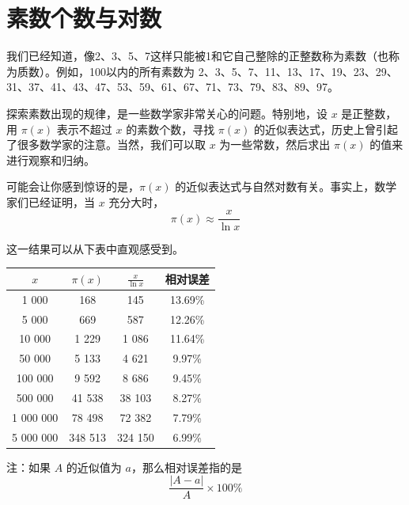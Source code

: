 \documentclass[a4paper,openany]{ctexbook}
\begin{document}
\section{素数个数与对数}

我们已经知道，像2、3、5、7这样只能被1和它自己整除的正整数称为素数（也称为质数）。例如，100以内的所有素数为
2、3、5、7、11、13、17、19、23、29、31、37、41、43、47、53、59、61、67、71、73、79、83、89、97。

探索素数出现的规律，是一些数学家非常关心的问题。特别地，设 \( x \) 是正整数，用 \(\pi(x)\) 表示不超过 \( x \) 的素数个数，寻找 \(\pi(x)\) 的近似表达式，历史上曾引起了很多数学家的注意。当然，我们可以取 \( x \) 为一些常数，然后求出 \(\pi(x)\) 的值来进行观察和归纳。

可能会让你感到惊讶的是，\(\pi(x)\) 的近似表达式与自然对数有关。事实上，数学家们已经证明，当 \( x \) 充分大时，
\[\pi(x) \approx \frac{x}{\ln x}\]

这一结果可以从下表中直观感受到。

\begin{table}[h]
    \centering
    \begin{tabular}{cccc}
        \toprule
        \( x \)   & \(\pi(x)\) & \(\frac{x}{\ln x}\) & 相对误差 \\
        \midrule
        1 000     & 168        & 145                 & 13.69\%  \\
        5 000     & 669        & 587                 & 12.26\%  \\
        10 000    & 1 229      & 1 086               & 11.64\%  \\
        50 000    & 5 133      & 4 621               & 9.97\%   \\
        100 000   & 9 592      & 8 686               & 9.45\%   \\
        500 000   & 41 538     & 38 103              & 8.27\%   \\
        1 000 000 & 78 498     & 72 382              & 7.79\%   \\
        5 000 000 & 348 513    & 324 150             & 6.99\%   \\
        \bottomrule
    \end{tabular}
\end{table}

注：如果 \( A \) 的近似值为 \( a \)，那么相对误差指的是
\[\frac{|A-a|}{A} \times 100\%\]

\listoftheorems[ignoreall,show={thmlevel1},title=定理索引]

\printindex
\end{document}
